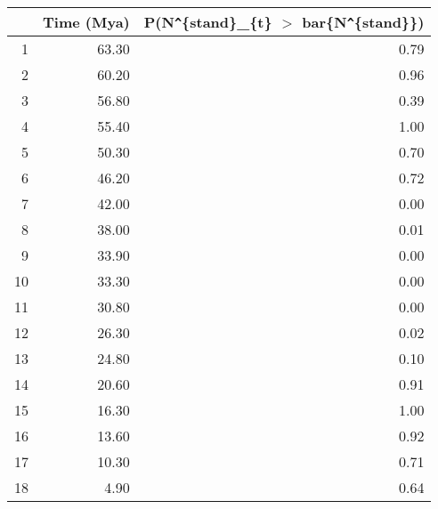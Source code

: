 \begin{table}[ht]
\centering
\begin{tabular}{rrr}
  \hline
 & Time (Mya) & P(N\verb|^|\{stand\}\_\{t\} $>$ bar\{N\verb|^|\{stand\}\}) \\ 
  \hline
1 & 63.30 & 0.79 \\ 
  2 & 60.20 & 0.96 \\ 
  3 & 56.80 & 0.39 \\ 
  4 & 55.40 & 1.00 \\ 
  5 & 50.30 & 0.70 \\ 
  6 & 46.20 & 0.72 \\ 
  7 & 42.00 & 0.00 \\ 
  8 & 38.00 & 0.01 \\ 
  9 & 33.90 & 0.00 \\ 
  10 & 33.30 & 0.00 \\ 
  11 & 30.80 & 0.00 \\ 
  12 & 26.30 & 0.02 \\ 
  13 & 24.80 & 0.10 \\ 
  14 & 20.60 & 0.91 \\ 
  15 & 16.30 & 1.00 \\ 
  16 & 13.60 & 0.92 \\ 
  17 & 10.30 & 0.71 \\ 
  18 & 4.90 & 0.64 \\ 
   \hline
\end{tabular}
\label{tab:div_peak}
\end{table}
